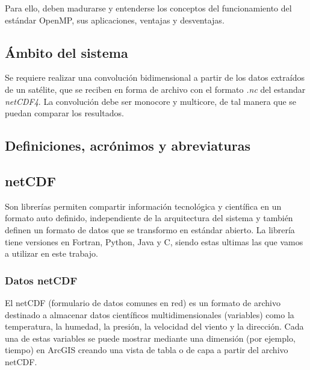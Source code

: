 \documentclass{article}
\begin{document}
Para ello, deben madurarse y entenderse los conceptos del funcionamiento del estándar OpenMP, sus aplicaciones, ventajas y desventajas.\\

\subsection{Ámbito del sistema}
Se requiere realizar una convolución bidimensional a partir de los datos extraídos de un satélite, que se reciben en forma de archivo con el formato \textit{.nc} del estandar \textit{netCDF4}. La convolución debe ser monocore y multicore, de tal manera que se puedan comparar los resultados.

\subsection{Definiciones, acrónimos y abreviaturas}
\subsection{netCDF}
Son librerías permiten compartir información tecnológica y científica en un formato auto definido, independiente de la arquitectura del sistema y también
definen un formato de datos que se transformo en estándar abierto. La librería tiene versiones en Fortran, Python, Java y C, siendo estas ultimas las que vamos
a utilizar en este trabajo.\\
\subsubsection{Datos netCDF}
El netCDF (formulario de datos comunes en red) es un formato de archivo destinado a almacenar datos científicos multidimensionales (variables) como la temperatura, la humedad, la presión, la velocidad del viento y la dirección. Cada una de estas variables se puede mostrar mediante una dimensión (por ejemplo, tiempo) en ArcGIS creando una vista de tabla o de capa a partir del archivo netCDF.
\end{document}
